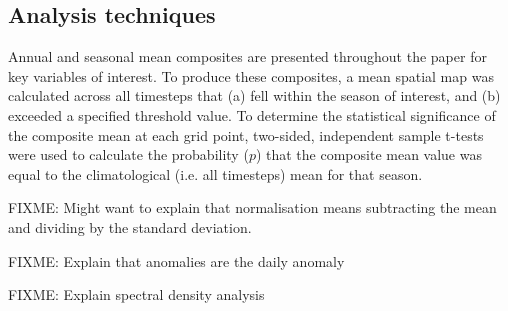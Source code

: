 \subsection{Analysis techniques}

Annual and seasonal mean composites are presented throughout the paper for key variables of interest. To produce these composites, a mean spatial map was calculated across all timesteps that (a) fell within the season of interest, and (b) exceeded a specified threshold value. To determine the statistical significance of the composite mean at each grid point, two-sided, independent sample t-tests were used to calculate the probability ($p$) that the composite mean value was equal to the climatological (i.e. all timesteps) mean for that season.    

FIXME: Might want to explain that normalisation means subtracting the mean and dividing by the standard deviation.

FIXME: Explain that anomalies are the daily anomaly

FIXME: Explain spectral density analysis